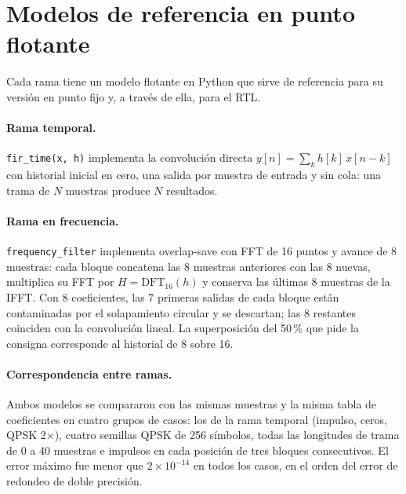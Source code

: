\section{Modelos de referencia en punto flotante}\label{sec:modelos}

Cada rama tiene un modelo flotante en Python que sirve de referencia para su versión en punto fijo y, a través de ella, para el RTL.

\paragraph{Rama temporal.} \texttt{fir\_time(x, h)} implementa la convolución directa $y[n] = \sum_k h[k]\,x[n-k]$ con historial inicial en cero, una salida por muestra de entrada y sin cola: una trama de $N$ muestras produce $N$ resultados.

\paragraph{Rama en frecuencia.} \texttt{frequency\_filter} implementa overlap-save con FFT de 16 puntos y avance de 8 muestras: cada bloque concatena las 8 muestras anteriores con las 8 nuevas, multiplica su FFT por $H = \mathrm{DFT}_{16}(h)$ y conserva las últimas 8 muestras de la IFFT. Con 8 coeficientes, las 7 primeras salidas de cada bloque están contaminadas por el solapamiento circular y se descartan; las 8 restantes coinciden con la convolución lineal. La superposición del 50\,\% que pide la consigna corresponde al historial de 8 sobre 16.

\paragraph{Correspondencia entre ramas.} Ambos modelos se compararon con las mismas muestras y la misma tabla de coeficientes en cuatro grupos de casos: los de la rama temporal (impulso, ceros, QPSK 2×), cuatro semillas QPSK de 256 símbolos, todas las longitudes de trama de 0 a 40 muestras e impulsos en cada posición de tres bloques consecutivos. El error máximo fue menor que $2\times10^{-14}$ en todos los casos, en el orden del error de redondeo de doble precisión.
